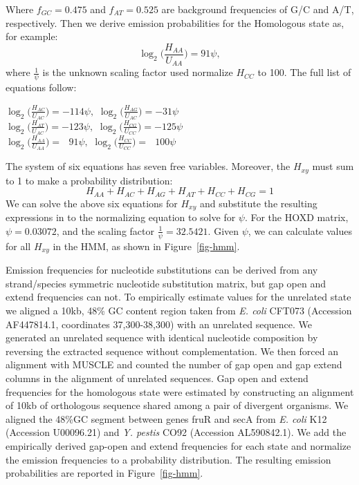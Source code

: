 \documentclass{ws-procs975x65}
\begin{document}
Where $f_{GC}=0.475$ and $f_{AT}=0.525$ are background frequencies of G/C and A/T, respectively.
Then we derive emission probabilities for the Homologous state as, for example:
\begin{equation}
\log_{2}\bigg(\frac{H_{AA}}{U_{AA}}\bigg) = 91\psi,
\end{equation}
where $\frac{1}{\psi}$ is the unknown scaling factor used normalize $H_{CC}$ to 100. The full list of equations follow:
\begin{center}$\log_{2}\bigg(\frac{H_{AC}}{U_{AC}}\bigg) = -114\psi,$
$\log_{2}\bigg(\frac{H_{AG}}{U_{AC}}\bigg) = -31\psi$ \\
$\log_{2}\bigg(\frac{H_{AT}}{U_{AC}}\bigg) = -123\psi,$
$\log_{2}\bigg(\frac{H_{CG}}{U_{CC}}\bigg) = -125\psi$ \\
$\log_{2}\bigg(\frac{H_{AA}}{U_{AA}}\bigg) = \ \ \ 91\psi,$
$\log_{2}\bigg(\frac{H_{CC}}{U_{CC}}\bigg) = \ \ \ 100\psi$ \\
\end{center}

The system of six equations has seven free variables.  Moreover, the $H_{xy}$ must sum to 1 to make a probability distribution:
\begin{equation}
H_{AA} + H_{AC} + H_{AG} + H_{AT} + H_{CC} + H_{CG} = 1
\end{equation}
We can solve the above six equations for $H_{xy}$ and substitute the resulting expressions in to the
normalizing equation to solve for $\psi$. For the HOXD matrix, $\psi=0.03072$, and the scaling factor $\frac{1}{\psi}=32.5421$. Given $\psi$, we can calculate values for all $H_{xy}$ in the HMM, as shown in Figure~\ref{fig-hmm}.

Emission frequencies for nucleotide substitutions can be derived from any strand/species symmetric nucleotide substitution matrix, but gap open and extend frequencies can not.  To empirically estimate values for the unrelated state we aligned a 10kb, 48\% GC content region taken from \emph{E. coli} CFT073 (Accession AF447814.1, coordinates 37,300-38,300) with an unrelated sequence.  We generated an unrelated sequence with identical nucleotide composition by reversing the extracted sequence without complementation.  We then forced an alignment with MUSCLE and counted the number of gap open and gap extend columns in the alignment of unrelated sequences.  Gap open and extend frequencies for the homologous state were estimated by constructing an alignment of 10kb of orthologous sequence shared among a pair of divergent organisms.  We aligned the 48\%GC segment between genes fruR and secA from \textit{E. coli} K12 (Accession U00096.21) and \emph{Y. pestis} CO92 (Accession AL590842.1). We add the empirically derived gap-open and extend frequencies for each state and normalize the emission frequencies to a probability distribution.  The resulting emission probabilities are reported in Figure~\ref{fig-hmm}.
\end{document}
